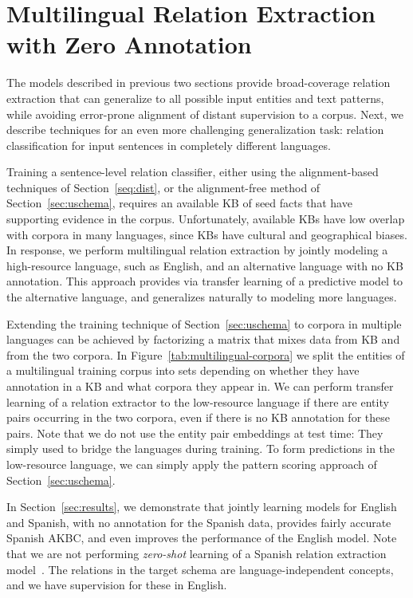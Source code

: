 \section{Multilingual Relation Extraction with Zero Annotation \label{sec:multilingual}}

The models described in previous two sections provide broad-coverage relation extraction that can generalize to all possible input entities and text patterns, while avoiding error-prone alignment of distant supervision to a corpus. Next, we describe techniques for an even more challenging generalization task: relation classification for input sentences in completely different languages.

Training a sentence-level relation classifier, either using the alignment-based techniques of Section~\ref{seq:dist}, or the alignment-free method of Section~\ref{sec:uschema}, requires an available KB of seed facts that have supporting evidence in the corpus.  Unfortunately, available KBs have low overlap with corpora in many languages, since KBs have cultural and geographical biases. In response, we perform multilingual relation extraction by jointly modeling a high-resource language, such as English, and an alternative language with no KB annotation. This approach provides via transfer learning of a predictive model to the alternative language, and generalizes naturally to modeling more languages. 


Extending the training technique of Section~\ref{sec:uschema} to corpora in multiple languages can be achieved by factorizing a matrix that mixes data from KB and from the two corpora. In Figure~\ref{tab:multilingual-corpora} we split the entities of a multilingual training corpus into sets depending on whether they have annotation in a KB and what corpora they appear in. We can perform transfer learning of a relation extractor to the low-resource language if there are entity pairs occurring in the two corpora, even if there is no KB annotation for these pairs. Note that we do not use the entity pair embeddings at test time: They simply used to bridge the languages during training. To form predictions in the low-resource language, we can simply apply the pattern scoring approach of Section~\ref{sec:uschema}.

In Section~\ref{sec:results}, we demonstrate that jointly learning models for English and Spanish, with no annotation for the Spanish data, provides fairly accurate Spanish AKBC, and even improves the performance of the English model. Note that we are not performing \textit{zero-shot} learning of a Spanish relation extraction model~\citep{zeroshot}. The relations in the target schema are language-independent concepts, and we have supervision for these in English. 

